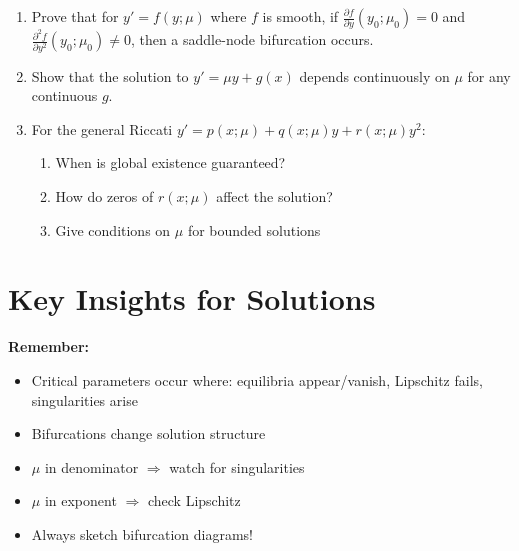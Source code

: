 \documentclass[12pt]{article}
\begin{document}
\begin{enumerate}[start=26]
    \item Prove that for $y' = f(y; \mu)$ where $f$ is smooth, if $\frac{\partial f}{\partial y}(y_0; \mu_0) = 0$ and $\frac{\partial^2 f}{\partial y^2}(y_0; \mu_0) \neq 0$, then a saddle-node bifurcation occurs.
    
    \item Show that the solution to $y' = \mu y + g(x)$ depends continuously on $\mu$ for any continuous $g$.
    
    \item For the general Riccati $y' = p(x; \mu) + q(x; \mu)y + r(x; \mu)y^2$:
    \begin{enumerate}[label=(\alph*)]
        \item When is global existence guaranteed?
        \item How do zeros of $r(x; \mu)$ affect the solution?
        \item Give conditions on $\mu$ for bounded solutions
    \end{enumerate}
\end{enumerate}

\section*{Key Insights for Solutions}

\textbf{Remember:}
\begin{itemize}
    \item Critical parameters occur where: equilibria appear/vanish, Lipschitz fails, singularities arise
    \item Bifurcations change solution structure
    \item $\mu$ in denominator $\Rightarrow$ watch for singularities
    \item $\mu$ in exponent $\Rightarrow$ check Lipschitz
    \item Always sketch bifurcation diagrams!
\end{itemize}
\end{document}
